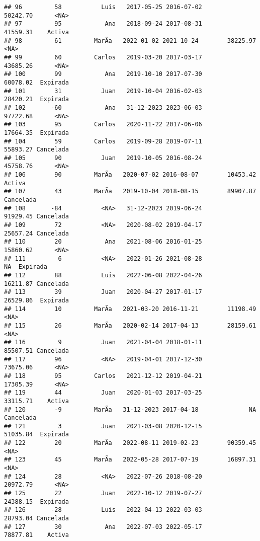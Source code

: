 \documentclass[
]{article}
\begin{document}
\begin{verbatim}
## 96         58           Luis   2017-05-25 2016-07-02        50242.70      <NA>
## 97         95            Ana   2018-09-24 2017-08-31        41559.31    Activa
## 98         61         MarÃ­a   2022-01-02 2021-10-24        38225.97      <NA>
## 99         60         Carlos   2019-03-20 2017-03-17        43685.26      <NA>
## 100        99            Ana   2019-10-10 2017-07-30        60078.02  Expirada
## 101        31           Juan   2019-10-04 2016-02-03        28420.21  Expirada
## 102       -60            Ana   31-12-2023 2023-06-03        97722.68      <NA>
## 103        95         Carlos   2020-11-22 2017-06-06        17664.35  Expirada
## 104        59         Carlos   2019-09-28 2019-07-11        55893.27 Cancelada
## 105        90           Juan   2019-10-05 2016-08-24        45758.76      <NA>
## 106        90         MarÃ­a   2020-07-02 2016-08-07        10453.42    Activa
## 107        43         MarÃ­a   2019-10-04 2018-08-15        89907.87 Cancelada
## 108       -84           <NA>   31-12-2023 2019-06-24        91929.45 Cancelada
## 109        72           <NA>   2020-08-02 2019-04-17        25657.24 Cancelada
## 110        20            Ana   2021-08-06 2016-01-25        15860.62      <NA>
## 111         6           <NA>   2022-01-26 2021-08-28              NA  Expirada
## 112        88           Luis   2022-06-08 2022-04-26        16211.87 Cancelada
## 113        39           Juan   2020-04-27 2017-01-17        26529.86  Expirada
## 114        10         MarÃ­a   2021-03-20 2016-11-21        11198.49      <NA>
## 115        26         MarÃ­a   2020-02-14 2017-04-13        28159.61      <NA>
## 116         9           Juan   2021-04-04 2018-01-11        85507.51 Cancelada
## 117        96           <NA>   2019-04-01 2017-12-30        73675.06      <NA>
## 118        95         Carlos   2021-12-12 2019-04-21        17305.39      <NA>
## 119        44           Juan   2020-01-03 2017-03-25        33115.71    Activa
## 120        -9         MarÃ­a   31-12-2023 2017-04-18              NA Cancelada
## 121         3           Juan   2021-03-08 2020-12-15        51035.84  Expirada
## 122        20         MarÃ­a   2022-08-11 2019-02-23        90359.45      <NA>
## 123        45         MarÃ­a   2022-05-28 2017-07-19        16897.31      <NA>
## 124        28           <NA>   2022-07-26 2018-08-20        20972.79      <NA>
## 125        22           Juan   2022-10-12 2019-07-27        24388.15  Expirada
## 126       -28           Luis   2022-04-13 2022-03-03        28793.04 Cancelada
## 127        30            Ana   2022-07-03 2022-05-17        78877.81    Activa

\end{verbatim}
\end{document}
